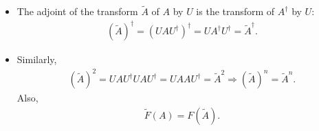 \begin{itemize}[itemsep=0pt,topsep=0pt]
    \item The adjoint of the transform $\tilde{A}$ of $A$ by $U$ is the transform of $A^\dagger$ by $U$:
    \begin{align*}
        (\tilde{A})^\dagger=(UAU^\dagger)^\dagger=UA^\dagger U^\dagger=\tilde{A}^\dagger.
    \end{align*}
    \item Similarly,
    \begin{align*}
        (\tilde{A})^2=UAU^\dagger UAU^\dagger=UAAU^\dagger=\tilde{A}^2\Longrightarrow(\tilde{A})^n=\tilde{A}^n.
    \end{align*}
    Also,
    \begin{align*}
        \tilde{F}(A)=F(\tilde{A}).
    \end{align*}
\end{itemize}